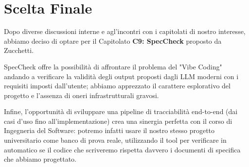 \documentclass[a4paper, 11pt]{article}
\begin{document}
\section{Scelta Finale}

Dopo diverse discussioni interne e agl'incontri con i capitolati di nostro interesse, abbiamo deciso di optare per il Capitolato \textbf{C9: SpecCheck} proposto da Zucchetti.

SpecCheck offre la possibilità di affrontare il problema del "Vibe Coding" andando a verificare la validità degli output proposti dagli LLM moderni con i requisiti imposti dall'utente; abbiamo apprezzato il carattere esplorativo del progetto e l'assenza di oneri infrastrutturali gravosi.  

Infine, l'opportunità di sviluppare una pipeline di tracciabilità end-to-end (dai casi d'uso fino all'implementazione) crea una sinergia perfetta con il corso di Ingegneria del Software: potremo infatti usare il nostro stesso progetto universitario come banco di prova reale, utilizzando il tool per verificare in automatico se il codice che scriveremo rispetta davvero i documenti di specifica che abbiamo progettato.
\end{document}
